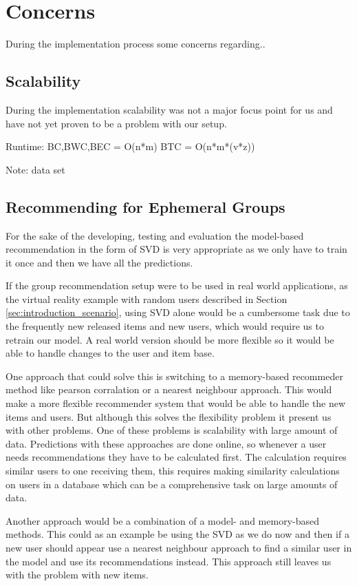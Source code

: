 \section{Concerns}
During the implementation process some concerns regarding..

\subsection{Scalability}
During the implementation scalability was not a major focus point for us and have not yet proven to be a problem with our setup. 

Runtime: 
BC,BWC,BEC = O(n*m)
BTC = O(n*m*(v*z))

Note: data set 

\subsection{Recommending for Ephemeral Groups}
For the sake of the developing, testing and evaluation the model-based recommendation in the form of SVD is very appropriate as we only have to train it once and then we have all the predictions. 

If the group recommendation setup were to be used in real world applications, as the virtual reality example with random users described in Section \ref{sec:introduction_scenario}, using SVD alone would be a cumbersome task due to the frequently new released items and new users, which would require us to retrain our model. A real world version should be more flexible so it would be able to handle changes to the user and item base. 

One approach that could solve this is switching to a memory-based recommeder method like pearson corralation or a nearest neighbour approach. This would make a more flexible recommender system that would be able to handle the new items and users. But although this solves the flexibility problem it present us with other problems. One of these problems is scalability with large amount of data\cite{DBLP:conf/adaptive/SchaferFHS07}. Predictions with these approaches are done online, so whenever a user needs recommendations they have to be calculated first. The calculation requires similar users to one receiving them, this requires making similarity calculations on users in a database which can be a comprehensive task on large amounts of data.

Another approach would be a combination of a model- and memory-based methods. This could as an example be using the SVD as we do now and then if a new user should appear use a nearest neighbour approach to find a similar user in the model and use its recommendations instead. This approach still leaves us with the problem with new items. 




